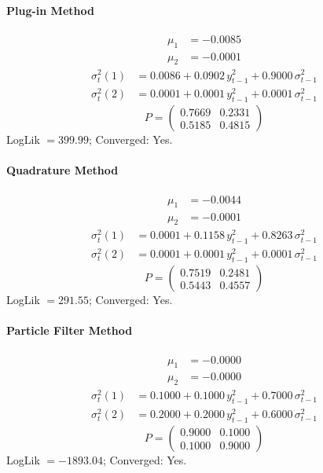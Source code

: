 \documentclass[11pt, a4paper]{article}
\begin{document}
\paragraph{Plug-in Method}
\begin{align}
\mu_{1} &= -0.0085 \\
\mu_{2} &= -0.0001
\end{align}
\begin{align}
\sigma^2_{t}(1) &= 0.0086 + 0.0902\, y_{t-1}^2 + 0.9000\, \sigma^2_{t-1} \\
\sigma^2_{t}(2) &= 0.0001 + 0.0001\, y_{t-1}^2 + 0.0001\, \sigma^2_{t-1}
\end{align}
\begin{equation}
P = \begin{pmatrix} 0.7669 & 0.2331 \\ 0.5185 & 0.4815 \end{pmatrix}
\end{equation}
LogLik $= 399.99$; Converged: Yes.

\paragraph{Quadrature Method}
\begin{align}
\mu_{1} &= -0.0044 \\
\mu_{2} &= -0.0001
\end{align}
\begin{align}
\sigma^2_{t}(1) &= 0.0001 + 0.1158\, y_{t-1}^2 + 0.8263\, \sigma^2_{t-1} \\
\sigma^2_{t}(2) &= 0.0001 + 0.0001\, y_{t-1}^2 + 0.0001\, \sigma^2_{t-1}
\end{align}
\begin{equation}
P = \begin{pmatrix} 0.7519 & 0.2481 \\ 0.5443 & 0.4557 \end{pmatrix}
\end{equation}
LogLik $= 291.55$; Converged: Yes.

\paragraph{Particle Filter Method}
\begin{align}
\mu_{1} &= -0.0000 \\
\mu_{2} &= -0.0000
\end{align}
\begin{align}
\sigma^2_{t}(1) &= 0.1000 + 0.1000\, y_{t-1}^2 + 0.7000\, \sigma^2_{t-1} \\
\sigma^2_{t}(2) &= 0.2000 + 0.2000\, y_{t-1}^2 + 0.6000\, \sigma^2_{t-1}
\end{align}
\begin{equation}
P = \begin{pmatrix} 0.9000 & 0.1000 \\ 0.1000 & 0.9000 \end{pmatrix}
\end{equation}
LogLik $= -1893.04$; Converged: Yes.

\clearpage
\end{document}

